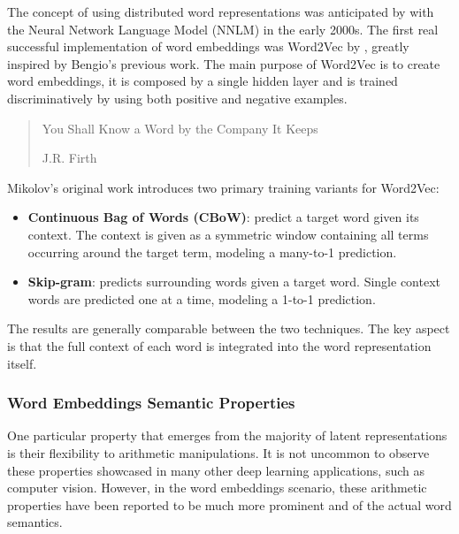 The concept of using distributed word representations was anticipated by \citet{bengio2020} with the Neural Network Language Model (NNLM) in the early 2000s.
The first real successful implementation of word embeddings was Word2Vec by \citet{mikolov2013}, greatly inspired by Bengio's previous work.
The main purpose of Word2Vec is to create word embeddings, it is composed by a single hidden layer and is trained discriminatively by using both positive and negative examples.

\blockquote[J.R. Firth]{You Shall Know a Word by the Company It Keeps}

\begin{figure}[H]
    \centering
    \quad
    \caption{}
    \label{fig:background_word2vec-cbow_word2vec-skipg}
\end{figure}

Mikolov's original work introduces two primary training variants for Word2Vec:
\begin{itemize}
    \item \textbf{Continuous Bag of Words (CBoW)}: predict a target word given its context.
The context is given as a symmetric window containing all terms occurring around the target term, modeling a many-to-1 prediction.
    \item \textbf{Skip-gram}: predicts surrounding words given a target word.
Single context words are predicted one at a time, modeling a 1-to-1 prediction.
\end{itemize}
The results are generally comparable between the two techniques.
The key aspect is that the full context of each word is integrated into the word representation itself.

\subsubsection*{Word Embeddings Semantic Properties}

One particular property that emerges from the majority of latent representations is their flexibility to arithmetic manipulations.
It is not uncommon to observe these properties showcased in many other deep learning applications, such as computer vision.
However, in the word embeddings scenario, these arithmetic properties have been reported to be much more prominent and  of the actual word semantics.

